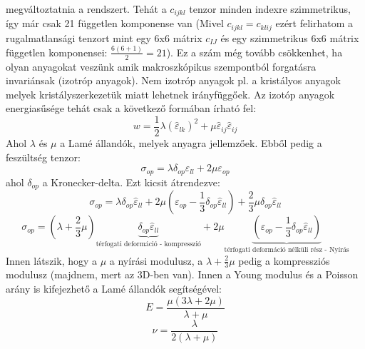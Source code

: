 \documentclass[../main.tex]{subfiles}
\begin{document}
megváltoztatnia a rendszert. Tehát a $c_{ijkl}$ tenzor minden indexre szimmetrikus, így már csak 21 független komponense van (Mivel $c_{ijkl} = c_{klij}$ ezért felirhatom a rugalmatlansági tenzort mint egy 6x6 mátrix $c_{IJ}$ és egy szimmetrikus 6x6 mátrix független komponensei: $\frac{6(6 + 1)}{2} = 21$).
Ez a szám még tovább csökkenhet, ha olyan anyagokat veszünk amik makroszkópikus szempontból forgatásra invariánsak (izotróp anyagok). Nem izotróp anyagok pl. a kristályos anyagok melyek kristályszerkezetük miatt lehetnek irányfüggőek.
Az izotóp anyagok energiasűsége tehát csak a következő formában írható fel:
\begin{equation}
    w = \frac{1}{2} \lambda (\hat{\varepsilon}_{lk})^2 + \mu \hat{\varepsilon}_{ij} \hat{\varepsilon}_{ij}
\end{equation}
Ahol $\lambda$ és $\mu$ a Lamé állandók, melyek anyagra jellemzőek. Ebből pedig a feszültség tenzor:
\begin{equation}
    \sigma_{op} = \lambda \delta_{op} \varepsilon_{ll} + 2 \mu \varepsilon_{op}
\end{equation}
ahol $\delta_{op}$ a Kronecker-delta. Ezt kicsit átrendezve:
\begin{equation}
    \sigma_{op} = \lambda \delta_{op} \hat{\varepsilon}_{ll} + 2 \mu \left(\varepsilon_{op} - \frac{1}{3} \delta_{op} \hat{\varepsilon}_{ll}\right) + \frac{2}{3} \mu \delta_{op} \hat{\varepsilon}_{ll}
\end{equation}
\begin{equation}
    \sigma_{op} = \left(\lambda + \frac{2}{3} \mu\right) \underbrace{\delta_{op} \hat{\varepsilon}_{ll}}_{\text{térfogati deformáció - kompresszió}} + 2 \mu \underbrace{\left(\varepsilon_{op} - \frac{1}{3} \delta_{op} \hat{\varepsilon}_{ll}\right)}_{\text{térfogati deformáció nélküli rész - Nyírás}}
\end{equation}
Innen látszik, hogy a $\mu$ a nyírási modulusz, a $\lambda + \frac{2}{3} \mu$ pedig a kompressziós modulusz (majdnem, mert az 3D-ben van).
Innen a Young modulus és a Poisson arány is kifejezhető a Lamé állandók segítségével:
\begin{equation}
    E = \frac{\mu (3 \lambda + 2 \mu)}{\lambda + \mu}
\end{equation}
\begin{equation}
    \nu = \frac{\lambda}{2(\lambda + \mu)}
\end{equation}
\end{document}
